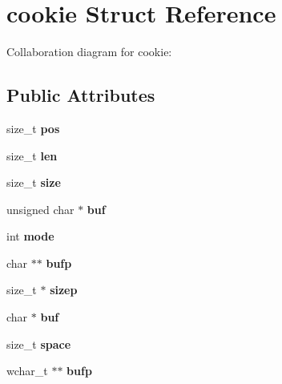 \hypertarget{structcookie}{}\section{cookie Struct Reference}
\label{structcookie}


Collaboration diagram for cookie\+:
\subsection*{Public Attributes}
\begin{DoxyCompactItemize}
\item 
\mbox{\label{structcookie_a569b1f49337f13434173fc9181bc6f38}} 
size\+\_\+t {\bfseries pos}
\item 
\mbox{\label{structcookie_a4d5231d26db3060629b6e785950b33ac}} 
size\+\_\+t {\bfseries len}
\item 
\mbox{\label{structcookie_a8955003eb1f32a2a7ad0513ada29f39f}} 
size\+\_\+t {\bfseries size}
\item 
\mbox{\label{structcookie_abd17d20b01a27bb46dd8e98052615a0d}} 
unsigned char $\ast$ {\bfseries buf}
\item 
\mbox{\label{structcookie_ae999e5a2457f92c72115fb8dd897ee1a}} 
int {\bfseries mode}
\item 
\mbox{\label{structcookie_a04f1608458759a569b3c07e6ba030483}} 
char $\ast$$\ast$ {\bfseries bufp}
\item 
\mbox{\label{structcookie_ac0e8b82d1eb12c8b969b3be724af84bd}} 
size\+\_\+t $\ast$ {\bfseries sizep}
\item 
\mbox{\label{structcookie_a8fe9c16d2e0b8987ede94e529aae87aa}} 
char $\ast$ {\bfseries buf}
\item 
\mbox{\label{structcookie_acdcf39d02fea1ad7c438714d7e311e7f}} 
size\+\_\+t {\bfseries space}
\item 
\mbox{\label{structcookie_a2f48ca0f5dcbacab1e6bc12ba16ccd93}} 
wchar\+\_\+t $\ast$$\ast$ {\bfseries bufp}

\end{DoxyCompactItemize}
